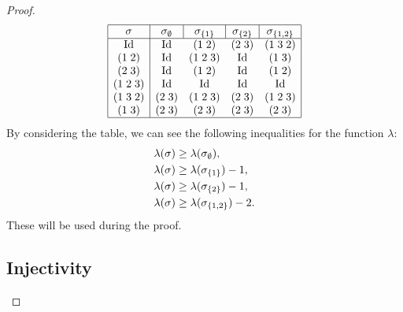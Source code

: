 \begin{proof}
\[
\begin{array}{|c|cccc|}
  \hline
  \sigma & \multicolumn{1}{c|}{\sigma_\emptyset} 
  & \multicolumn{1}{c|}{\sigma_{\set{1}}} 
  & \multicolumn{1}{c|}{\sigma_{\set{2}}} & \sigma_{\set{1,2}} \\
  \hline
  \Id & \Id & (1\;2) & (2\;3) & (1\;3\;2) \\
  (1\;2) & \Id & (1\;2\;3) & \Id & (1\;3) \\
  (2\;3) & \Id & (1\;2) & \Id & (1\;2) \\
  (1\;2\;3) & \Id & \Id & \Id & \Id \\
  (1\;3\;2) & (2\;3) & (1\;2\;3) & (2\;3) & (1\;2\;3) \\
  (1\;3) & (2\; 3) & (2\;3) & (2\;3) & (2\;3) \\
  \hline
\end{array}
\] 
By considering the table, we can see the following inequalities for
the function $\lambda$:
\begin{align*}
  \lambda(\sigma) &\geq \lambda(\sigma_{\emptyset}), \\
  \lambda(\sigma) &\geq \lambda(\sigma_{\left\{ 1 \right\}}) - 1, \\
  \lambda(\sigma) &\geq \lambda(\sigma_{\left\{ 2 \right\}}) - 1, \\
  \lambda(\sigma) &\geq \lambda(\sigma_{\left\{ 1,2 \right\}}) - 2. \\
\end{align*}
These will be used during the proof.

\subsection{Injectivity}


\end{proof}
